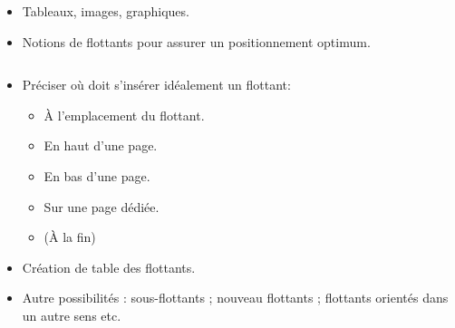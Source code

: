 \begin{slide}
  \begin{itemize}
    \item Tableaux, images, graphiques.
    \item Notions de flottants pour assurer un positionnement optimum.
  \end{itemize}
\end{slide}

\begin{slide}
  \inputminted{latex}{examples/flottant.tex}
\end{slide}

\begin{slide}
  \begin{itemize}
    \item Préciser où doit s'insérer idéalement un flottant:
      \begin{itemize}
	\item À l'emplacement du flottant.
	\item En haut d'une page.
	\item En bas d'une page.
	\item Sur une page dédiée.
	\item (À la fin)
      \end{itemize}
    \item Création de table des flottants.
    \item Autre possibilités : sous-flottants ; nouveau flottants ; flottants orientés dans un autre sens etc.
  \end{itemize}
\end{slide}

